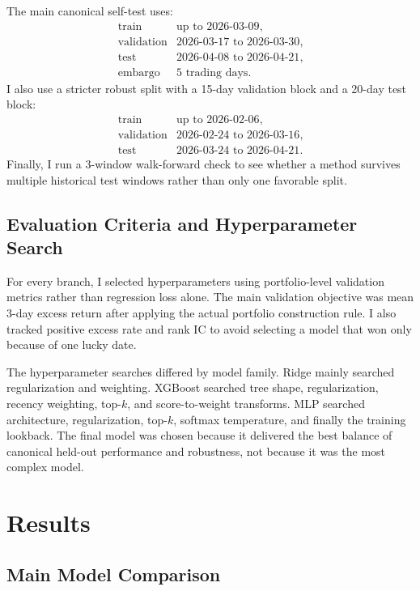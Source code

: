 \documentclass[11pt]{article}
\begin{document}
The main canonical self-test uses:
\[
\begin{array}{ll}
\text{train} & \text{up to 2026-03-09},\\
\text{validation} & \text{2026-03-17 to 2026-03-30},\\
\text{test} & \text{2026-04-08 to 2026-04-21},\\
\text{embargo} & 5\text{ trading days}.
\end{array}
\]
I also use a stricter robust split with a 15-day validation block and a 20-day
test block:
\[
\begin{array}{ll}
\text{train} & \text{up to 2026-02-06},\\
\text{validation} & \text{2026-02-24 to 2026-03-16},\\
\text{test} & \text{2026-03-24 to 2026-04-21}.
\end{array}
\]
Finally, I run a 3-window walk-forward check to see whether a method survives
multiple historical test windows rather than only one favorable split.

\subsection{Evaluation Criteria and Hyperparameter Search}

For every branch, I selected hyperparameters using portfolio-level validation
metrics rather than regression loss alone. The main validation objective was
mean 3-day excess return after applying the actual portfolio construction rule.
I also tracked positive excess rate and rank IC to avoid selecting a model that
won only because of one lucky date.

The hyperparameter searches differed by model family. Ridge mainly searched
regularization and weighting. XGBoost searched tree shape, regularization,
recency weighting, top-\(k\), and score-to-weight transforms. MLP searched
architecture, regularization, top-\(k\), softmax temperature, and finally the
training lookback. The final model was chosen because it delivered the best
balance of canonical held-out performance and robustness, not because it was
the most complex model.

\section{Results}

\subsection{Main Model Comparison}
\end{document}
